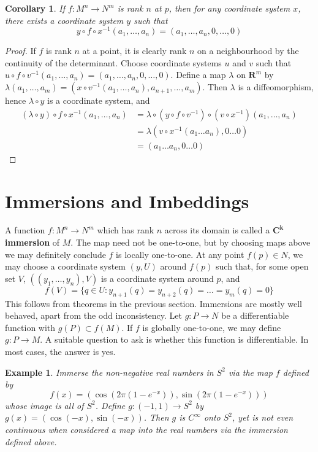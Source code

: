 \documentclass[12pt]{report}
\theoremstyle{plain}
\newtheorem{corollary}[theorem]{Corollary}
\newtheorem*{example}{Example}
\theoremstyle{definition}
\begin{document}
\begin{corollary}
    If $f: M^n \to N^m$ is rank $n$ at $p$, then for any coordinate system $x$, there exists a coordinate system $y$ such that
    \[ y \circ f \circ x^{-1} (a_1, \dots, a_n) = (a_1, \dots, a_n, 0, \dots, 0) \]
\end{corollary}
\begin{proof}
    If $f$ is rank $n$ at a point, it is clearly rank $n$ on a neighbourhood by the continuity of the determinant. Choose coordinate systems $u$ and $v$ such that $u \circ f \circ v^{-1}(a_1, \dots, a_n) = (a_1, \dots, a_n, 0, \dots, 0)$. Define a map $\lambda$ on $\mathbf{R}^m$ by $\lambda(a_1, \dots, a_m) = (x \circ v^{-1}(a_1, \dots, a_n), a_{n+1}, \dots, a_m)$. Then $\lambda$ is a diffeomorphism, hence $\lambda \circ y$ is a coordinate system, and
    \begin{align*}
        (\lambda \circ y) \circ f \circ x^{-1} (a_1, \dots, a_n) &= \lambda \circ (y \circ f \circ v^{-1}) \circ (v \circ x^{-1}) (a_1, \dots, a_n)\\
        &= \lambda (v \circ x^{-1} (a_1 \dots a_n), 0 \dots 0)\\
        &= (a_1 \dots a_n, 0 \dots 0)
    \end{align*}
\end{proof}

\section{Immersions and Imbeddings}

A function $f:M^n \to N^m$ which has rank $n$ across its domain is called a {\bf $\mathbf{C^k}$ immersion} of $M$. The map need not be one-to-one, but by choosing maps above we may definitely conclude $f$ is locally one-to-one. At any point $f(p) \in N$, we may choose a coordinate system $(y,U)$ around $f(p)$ such that, for some open set $V$, $((y_1, \dots, y_n),V)$ is a coordinate system around $p$, and
%
\[ f(V) = \{ q \in U : y_{n+1}(q) = y_{n+2}(q) = \dots = y_m(q) = 0 \} \]
%
This follows from theorems in the previous section. Immersions are mostly well behaved, apart from the odd inconsistency. Let $g:P \to N$ be a differentiable function with $g(P) \subset f(M)$. If $f$ is globally one-to-one, we may define $g:P \to M$. A suitable question to ask is whether this function is differentiable. In most cases, the answer is yes.

\begin{example}
    Immerse the non-negative real numbers in $S^2$ via the map $f$ defined by
    \[ f(x) = (\cos(2\pi(1 - e^{-x})), \sin(2\pi(1 - e^{-x}))) \]
    whose image is all of $S^2$. Define $g:(-1,1) \to S^2$ by $g(x) = (\cos(-x), \sin(-x))$. Then $g$ is $C^\infty$ onto $S^2$, yet is not even continuous when considered a map into the real numbers via the immersion defined above.
\end{example}
\end{document}
